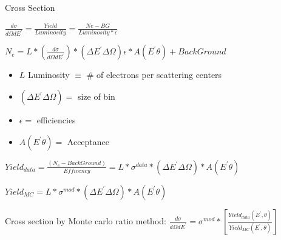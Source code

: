 \documentclass{beamer}
\begin{document}
\begin{frame}{Cross Section}
\begin{block}{}
	
	\centering
	$\frac{d\sigma}{d\Omega dE^\prime} =  \frac{Yield}{Luminosity} = \frac{Ne - BG }{Luminosity *  \epsilon} $
	
	\centering
	$N_e = \textit{L} * \left( \frac{d\sigma}{d\Omega dE^\prime} \right) * \left( \Delta E^\prime \Delta \Omega\right) \epsilon * A \left(E^\prime \theta \right)  + Back  Ground$
	
	\begin{itemize}
		\item $\textit{L}$ Luminosity $\equiv$ \# of electrons per scattering centers
		\item $\left( \Delta E^\prime \Delta \Omega\right) = $ size of bin
		\item $\epsilon = $ efficiencies
		\item  $A \left(E^\prime \theta \right) =$ Acceptance 
		
	\end{itemize}
	
	$ Yield_{data} = \frac{\left(N_e - BackGround\right)}{Efficency } =  \textit{L} *\sigma^{data} * \left( \Delta E^\prime \Delta \Omega\right)*  A \left(E^\prime \theta \right)$
	
	$ Yield_{MC} = \textit{L} *\sigma^{mod} * \left( \Delta E^\prime \Delta \Omega\right)*  A \left(E^\prime \theta \right)$
\end{block}



\begin{center}
	
	\begin{block}{}
		Cross section by Monte carlo ratio  method:
		\centering $ \frac{d\sigma}{d\Omega dE^\prime} = \sigma^{mod} * \left[\frac{Yield_{data} \left( 
			E^\prime,\theta\right)} {Yield_{MC}\left(E^\prime,\theta\right)}\right] $
		
	\end{block}	
\end{center}



\end{frame}
\end{document}
